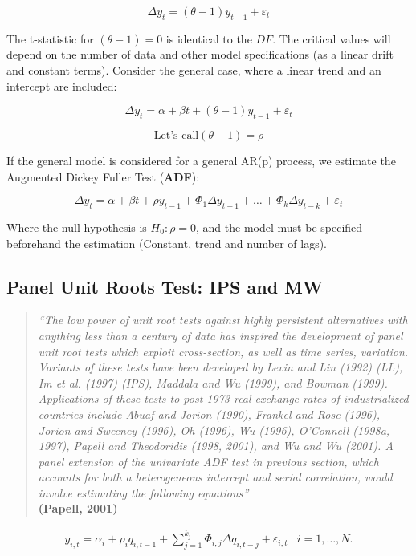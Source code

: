 \documentclass[]{article}
\begin{document}
\[\Delta y_{t} = (\theta - 1)y_{t-1} + \varepsilon_{t}\]

The t-statistic for \((\theta - 1) = 0\) is identical to the \(DF\). The critical values will depend on the number of data and other model specifications (as a linear drift and constant terms). Consider the general case, where a linear trend and an intercept are included:

\[\Delta y_{t} = \alpha + \beta t + (\theta -1)y_{t-1} + \varepsilon_{t}\]

\[\textrm{Let's call} (\theta -1) = \rho\]

If the general model is considered for a general AR(p) process, we estimate the Augmented Dickey Fuller Test (\textbf{ADF}):

\[\Delta y_{t} = \alpha + \beta t + \rho y_{t-1} + \varPhi_1\Delta y_{t-1} + \dots + \varPhi_k\Delta y_{t-k} + \varepsilon_{t}\]

Where the null hypothesis is \(H_{0}: \rho = 0\), and the model must be specified beforehand the estimation (Constant, trend and number of lags).

\hypertarget{panel-unit-roots-test-ips-and-mw}{%
\subsection{Panel Unit Roots Test: IPS and MW}\label{panel-unit-roots-test-ips-and-mw}}

\begin{quote}
\emph{``The low power of unit root tests against highly persistent alternatives with anything less than a century of data has inspired the development of panel unit root tests which exploit cross-section, as well as time series, variation. Variants of these tests have been developed by Levin and Lin (1992) (LL), Im et al. (1997) (IPS), Maddala and Wu (1999), and Bowman (1999). Applications of these tests to post-1973 real exchange rates of industrialized countries include Abuaf and Jorion (1990), Frankel and Rose (1996), Jorion and Sweeney (1996), Oh (1996), Wu (1996), O'Connell (1998a, 1997), Papell and Theodoridis (1998, 2001), and Wu and Wu (2001). A panel extension of the univariate ADF test in previous section, which accounts for both a heterogeneous intercept and serial correlation, would involve estimating the following equations''}\\
\textbf{(Papell, 2001)}
\end{quote}

\begin{eqnarray*}
    y_{i,t} =\alpha_{i} + \rho_{i}q_{i, t-1} + \sum_{j=1}^{k_{j}}\Phi_{i,j}\Delta q_{i, t-j} + \varepsilon_{i,t}  & i = 1, \dots, N. 
\end{eqnarray*}
\end{document}
